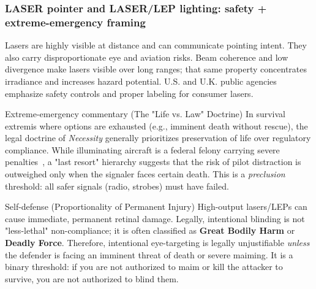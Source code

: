 \begin{frame}[t,shrink=3]
  \frametitle{LASER pointer and LASER/LEP lighting: safety + extreme-emergency framing}
  \justifying
    Lasers are highly visible at distance and can communicate pointing intent. They also carry disproportionate eye and aviation risks. Beam coherence and low divergence make lasers visible over long ranges; that same property concentrates irradiance and increases hazard potential. U.S. and U.K. public agencies emphasize safety controls and proper labeling for consumer lasers.~\cite{fda_laser_pointers,uk_laser_safety}

  \vspace{0.8em}
   
  \begin{block}{Extreme-emergency commentary (The "Life vs. Law" Doctrine)}
    \footnotesize 
    \justifying
    In survival extremis where options are exhausted (e.g., imminent death without rescue), the legal doctrine of \emph{Necessity} generally prioritizes preservation of life over regulatory compliance. While illuminating aircraft is a federal felony carrying severe penalties~\cite{faa_lasers,usc_39a}, a "last resort" hierarchy suggests that the risk of pilot distraction is outweighed only when the signaler faces certain death. This is a \emph{preclusion} threshold: all safer signals (radio, strobes) must have failed.
  \end{block}

  \begin{block}{Self-defense (Proportionality of Permanent Injury)}
    \footnotesize 
    \justifying
    High-output lasers/LEPs can cause immediate, permanent retinal damage. Legally, intentional blinding is not "less-lethal" non-compliance; it is often classified as \textbf{Great Bodily Harm} or \textbf{Deadly Force}. Therefore, intentional eye-targeting is legally unjustifiable \emph{unless} the defender is facing an imminent threat of death or severe maiming. It is a binary threshold: if you are not authorized to maim or kill the attacker to survive, you are not authorized to blind them.
  \end{block}
\end{frame}

